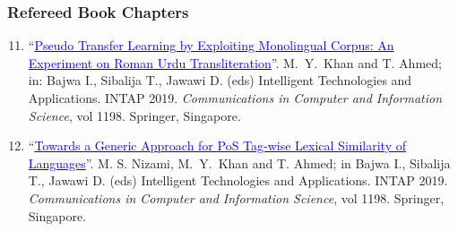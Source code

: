 \documentclass[a4paper, 10pt]{article}
\begin{document}
\subsubsection*{{Refereed Book Chapters}}
\begin{enumerate}
\setcounter{enumi}{10}
\itemsep-4pt
\item ``\href{https://doi.org/10.1007/978-981-15-5232-8_36}{\textcolor{blue}{Pseudo Transfer Learning by Exploiting Monolingual Corpus: An Experiment on Roman Urdu Transliteration}}''. \textcolor{NavyBlue}{M.~Y.~Khan} and T. Ahmed; in: Bajwa I., Sibalija T., Jawawi D. (eds) Intelligent Technologies and Applications. INTAP 2019. \emph{Communications in Computer and Information Science}, vol 1198. Springer, Singapore.

\item ``\href{https://doi.org/10.1007/978-981-15-5232-8_42}{\textcolor{blue}{Towards a Generic Approach for PoS Tag-wise Lexical Similarity of Languages}}''. M. S. Nizami, \textcolor{NavyBlue}{M.~Y.~Khan} and T. Ahmed; in Bajwa I., Sibalija T., Jawawi D. (eds) Intelligent Technologies and Applications. INTAP 2019. \emph{Communications in Computer and Information Science}, vol 1198. Springer, Singapore.

\end{enumerate}
\end{document}
